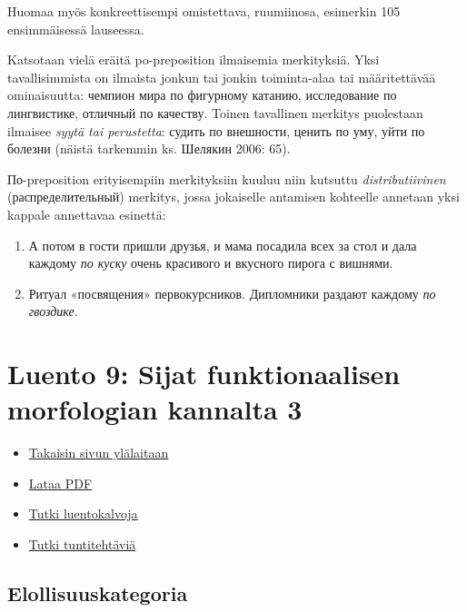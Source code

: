 \documentclass[]{scrartcl}
\providecommand{\tightlist}{%
  \setlength{\itemsep}{0pt}\setlength{\parskip}{0pt}}
\begin{document}
Huomaa myös konkreettisempi omistettava, ruumiinosa, esimerkin 105
ensimmäisessä lauseessa.

Katsotaan vielä eräitä po-preposition ilmaisemia merkityksiä. Yksi
tavallisimmista on ilmaista jonkun tai jonkin toiminta-alaa tai
määritettävää ominaisuutta: чемпион мира по фигурному катанию,
исследование по лингвистике, отличный по качеству. Toinen tavallinen
merkitys puolestaan ilmaisee \emph{syytä tai perustetta}: судить по
внешности, ценить по уму, уйти по болезни (näistä tarkemmin ks. Шелякин
2006: 65).

По-preposition erityisempiin merkityksiin kuuluu niin kutsuttu
\emph{distributiivinen} (распределительный) merkitys, jossa jokaiselle
antamisen kohteelle annetaan yksi kappale annettavaa esinettä:

\begin{enumerate}
\def\labelenumi{(\arabic{enumi})}
\setcounter{enumi}{105}
\tightlist
\item
  А потом в гости пришли друзья, и мама посадила всех за стол и дала
  каждому \emph{по куску} очень красивого и вкусного пирога с вишнями.
\item
  Ритуал «посвящения» первокурсников. Дипломники раздают каждому
  \emph{по гвоздике}.
\end{enumerate}

\section{Luento 9: Sijat funktionaalisen morfologian kannalta
3}\label{luento-9-sijat-funktionaalisen-morfologian-kannalta-3}

\begin{itemize}
\tightlist
\item
  \href{https://mustikka.uta.fi/~juho_harme/morfologia/\#tästä-kurssista}{Takaisin
  sivun ylälaitaan}
\item
  \href{http://mustikka.uta.fi/~juho_harme/morfologia/materiaalit/luento9.pdf}{Lataa
  PDF}
\item
  \href{http://mustikka.uta.fi/~juho_harme/morfologia/presentations/luento9.html}{Tutki
  luentokalvoja}
\item
  \href{http://mustikka.uta.fi/~juho_harme/morfologia/tehtavat/luento9.pdf}{Tutki
  tuntitehtäviä}
\end{itemize}

\subsection{Elollisuuskategoria}\label{elollisuuskategoria}
\end{document}
